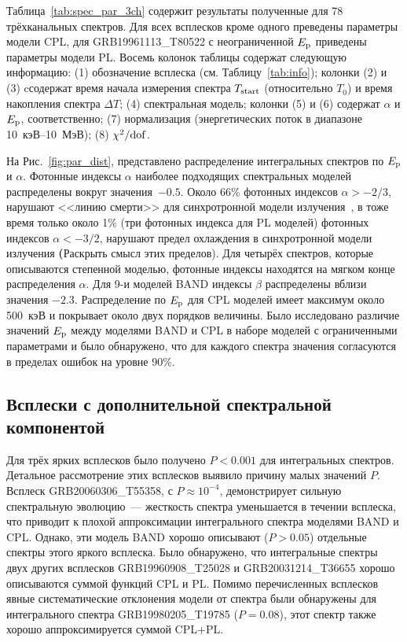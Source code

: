 Таблица~\ref{tab:spec_par_3ch} содержит результаты полученные для 78 трёхканальных спектров. 
Для всех всплесков кроме одного преведены параметры модели CPL, для GRB19961113\_T80522 с 
неограниченной $E_{\mathrm{p}}$ приведены параметры модели PL. 
Восемь колонок таблицы содержат следующую информацию: 
(1) обозначение всплеска (см. Таблицу~\ref{tab:info});
колонки (2) и (3) cсодержат время начала измерения спектра $T_{\mathrm{start}}$ (относительно $T_0$) 
и время накопления спектра $\Delta T$;
(4) спектральная модель; 
колонки (5) и (6) содержат $\alpha$ и $E_{\mathrm{p}}$, соответственно;
(7) нормализация (энергетических поток в диапазоне 10~кэВ--10~МэВ); 
(8) $\chi^2/{\mathrm{dof}}$.

На Рис.~\ref{fig:par_dist}, представлено распределение интегральных спектров по $E_{\mathrm{p}}$ и $\alpha$.
Фотонные индексы $\alpha$ наиболее подходящих спектральных моделей распределены 
вокруг значения~$-0.5$. 
Около 66\% фотонных индексов $\alpha > -2/3$, нарушают <<линию смерти>> для 
синхротронной модели излучения~\citep{Preece_1998ApJL}, в тоже время только около 
1\% (три фотонных индекса для PL моделей) фотонных индексов $\alpha< -3/2$, 
нарушают предел охлаждения в синхротронной модели излучения \textbf(Раскрыть смысл этих пределов). 
Для четырёх спектров, которые описываются степенной моделью, фотонные индексы 
находятся на мягком конце распределения $\alpha$. Для 9-и моделей BAND индексы $\beta$
распределены вблизи значения $-2.3$.
Распределение по $E_{\mathrm{p}}$ для CPL моделей имеет максимум около 500~кэВ 
и покрывает около двух порядков величины. 
Было исследовано различие значений $E_{\mathrm{p}}$ между моделями BAND и CPL в наборе 
моделей с ограниченными параметрами и было обнаружено, что для каждого спектра значения согласуются
в пределах ошибок на уровне 90\%.

\subsection{Всплески с дополнительной спектральной компонентой}
Для трёх ярких всплесков было получено $P<0.001$ для интегральных спектров. 
Детальное рассмотрение этих всплесков выявило причину малых значений $P$.
Всплеск GRB20060306\_T55358, с $P \approx 10^{-4}$, демонстрирует сильную 
спектральную эволюцию~--- жесткость спектра уменьшается в течении всплеска, 
что приводит к плохой аппроксимации интегрального спектра моделями BAND и CPL.
Однако, эти модель BAND хорошо описывают ($P>0.05$) отдельные спектры этого яркого всплеска.
Было обнаружено, что интегральные спектры двух других всплесков GRB19960908\_T25028 и GRB20031214\_T36655
хорошо описываются суммой функций CPL и PL.
Помимо перечисленных всплесков явные систематические отклонения модели от спектра
были обнаружены для интегрального спектра GRB19980205\_T19785 ($P=0.08$), 
этот спектр также хорошо аппроксимируется суммой CPL+PL.
 
